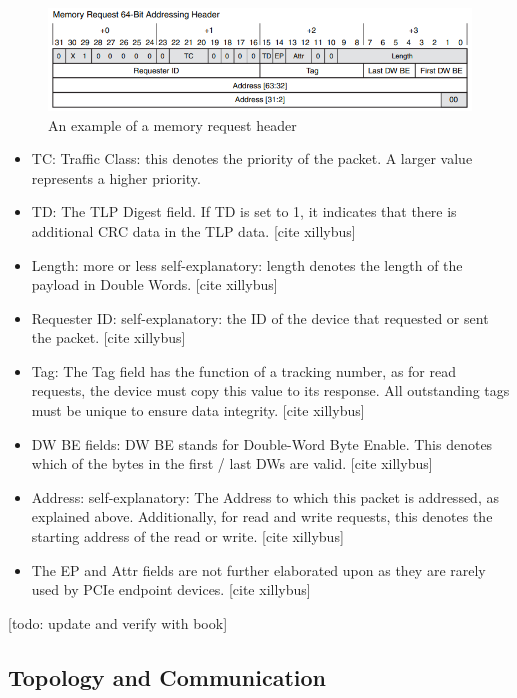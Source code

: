 \begin{figure}
\includegraphics[width = \linewidth]{figures/PCIE-header}
\caption{An example of a memory request header ~\parencite{lawley_understanding_2014}}
\label{fig:header}
\end{figure}


\begin{itemize}
\item TC: Traffic Class: this denotes the priority of the packet. A larger value represents a higher priority.~\parencite{jackson_pci_2012}
\item TD: The TLP Digest field. If TD is set to 1, it indicates that there is additional CRC data in the TLP data. [cite xillybus]
\item Length: more or less self-explanatory: length denotes the length of the payload in Double Words. [cite xillybus]
\item Requester ID: self-explanatory: the ID of the device that requested or sent the packet. [cite xillybus]
\item Tag: The Tag field has the function of a tracking number, as for read requests, the device must copy this value to its response. All outstanding tags must be unique to ensure data integrity. [cite xillybus]
\item DW BE fields: DW BE stands for Double-Word Byte Enable. This denotes which of the bytes in the first / last DWs are valid. [cite xillybus]
\item Address: self-explanatory: The Address to which this packet is addressed, as explained above. Additionally, for read and write requests, this denotes the starting address of the read or write. [cite xillybus]
\item The EP and Attr fields are not further elaborated upon as they are rarely used by PCIe endpoint devices. [cite xillybus]
\end{itemize}

[todo: update and verify with book]

\subsection{Topology and Communication}

